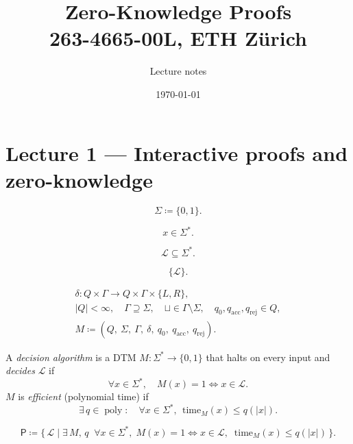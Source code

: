 \documentclass[11pt,a4paper]{article}
\title{\vspace{-1.5em}Zero-Knowledge Proofs\\[0.3em]\large 263-4665-00L, ETH Z\"urich}
\author{Lecture notes}
\date{\today}
\newcommand{\bits}{\{0,1\}}
\newcommand{\lang}{\mathcal{L}}
\DeclareMathOperator{\poly}{poly}
\begin{document}
\maketitle
\tableofcontents
\bigskip

\section{Lecture 1 --- Interactive proofs and zero-knowledge}

\begin{definition}[Alphabet]
\[
  \Sigma \coloneqq \bits .
\]
\end{definition}

\begin{definition}[Statement]
\[
  x \in \Sigma^{*} .
\]
\end{definition}

\begin{definition}[Language]
\[
  \lang \subseteq \Sigma^{*} .
\]
\end{definition}

\begin{definition}
\[
  \{\lang\} .
\]
\end{definition}

\begin{definition}
\begin{gather*}
  \delta : Q\times\Gamma \to Q\times\Gamma\times\{L,R\},\\
  |Q| < \infty,\quad
  \Gamma \supseteq \Sigma,\quad
  \sqcup \in \Gamma\setminus\Sigma,\quad
  q_0, q_{\mathrm{acc}}, q_{\mathrm{rej}} \in Q,\\
  M \coloneqq (Q,\ \Sigma,\ \Gamma,\ \delta,\ q_0,\ q_{\mathrm{acc}},\ q_{\mathrm{rej}}).
\end{gather*}
\end{definition}

\begin{definition}
A \emph{decision algorithm} is a DTM $M:\Sigma^{*}\to\bits$ that halts on every input and \emph{decides} $\lang$ if
\[
  \forall x \in \Sigma^{*},\quad M(x)=1 \iff x\in\lang .
\]
$M$ is \emph{efficient} (polynomial time) if
\[
  \exists\, q \in \poly :\quad \forall x \in \Sigma^{*},\ \ \mathrm{time}_M(x) \le q(|x|) .
\]
\end{definition}

\begin{definition}[$\mathsf{P}$]
\[
  \mathsf{P} \coloneqq \bigl\{\,\lang \mid \exists\, M,\, q \;\;
  \forall x \in \Sigma^{*},\;
  M(x)=1 \iff x\in\lang,\;\; \mathrm{time}_M(x)\le q(|x|)\,\bigr\}.
\]
\end{definition}
\end{document}
